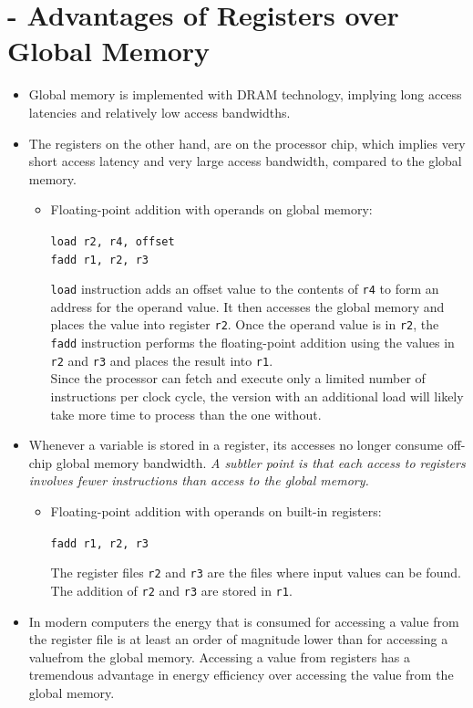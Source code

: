 \section{- Advantages of Registers over Global Memory}
\begin{itemize}
    \item Global memory is implemented with DRAM technology, implying long access latencies and relatively low access bandwidths.
    \item The registers on the other hand, are on the processor chip, which implies very short access latency and very large access bandwidth, compared to the global memory.
          \begin{itemize}
              \item Floating-point addition with operands on global memory:
                    \begin{center}
                        \texttt{load r2, r4, offset}\\
                        \texttt{fadd r1, r2, r3}
                    \end{center}
                    \texttt{load} instruction adds an offset value to the contents of \texttt{r4} to form an address for the operand value. It then accesses the global memory and places the value into register \texttt{r2}. Once the operand value is in \texttt{r2}, the \texttt{fadd} instruction performs the floating-point addition using the values in \texttt{r2} and \texttt{r3} and places the result into \texttt{r1}.\\
                    Since the processor can fetch and execute only a limited number of instructions per clock cycle, the version with an additional load will likely take more time to process than the one without.
          \end{itemize}
    \item Whenever a variable is stored in a register, its accesses no longer consume off-chip global memory bandwidth. \textsl{A subtler point is that each access to registers involves fewer instructions than access to the global memory.}
          \begin{itemize}
              \item Floating-point addition with operands on built-in registers:
                    \begin{center}
                        \texttt{fadd r1, r2, r3}
                    \end{center}
                    The register files \texttt{r2} and \texttt{r3} are the files where input values can be found. The addition of \texttt{r2} and \texttt{r3} are stored in \texttt{r1}.
          \end{itemize}
    \item In modern computers the energy that is consumed for accessing a value from the register file is at least an order of magnitude lower than for accessing a valuefrom the global memory. Accessing a value from registers has a tremendous advantage
          in energy efficiency over accessing the value from the global memory.
\end{itemize}

